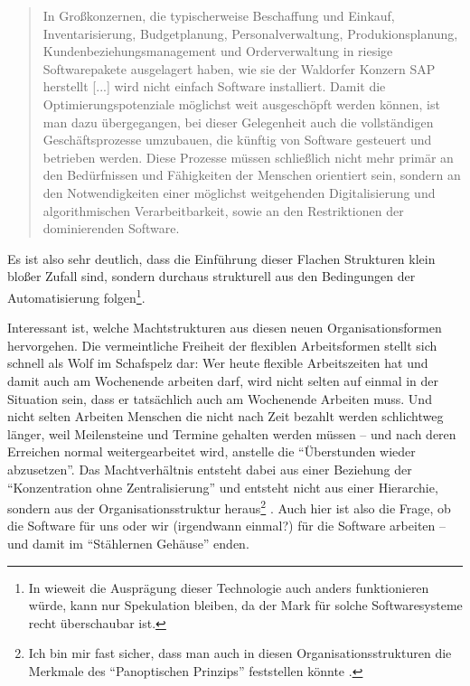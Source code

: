 \begin{quote}
	In Großkonzernen, die typischerweise Beschaffung und Einkauf, Inventarisierung, Budgetplanung, Personalverwaltung, Produkionsplanung, Kundenbeziehungsmanagement und Orderverwaltung in riesige Softwarepakete ausgelagert haben, wie sie der Waldorfer Konzern SAP herstellt [...] wird nicht einfach Software installiert. Damit die Optimierungspotenziale möglichst weit ausgeschöpft werden können, ist man dazu übergegangen, bei dieser Gelegenheit auch die vollständigen Geschäftsprozesse umzubauen, die künftig von Software gesteuert und betrieben werden. Diese Prozesse müssen schließlich nicht mehr primär an den Bedürfnissen und Fähigkeiten der Menschen orientiert sein, sondern an den Notwendigkeiten einer möglichst weitgehenden Digitalisierung und algorithmischen Verarbeitbarkeit, sowie an den Restriktionen der dominierenden Software.
	
	\em \cite[172f.]{arbeitsfrei}
\end{quote}

Es ist also sehr deutlich, dass die Einführung dieser Flachen Strukturen klein bloßer Zufall sind, sondern durchaus strukturell aus den Bedingungen der Automatisierung folgen\footnote{In wieweit die Ausprägung dieser Technologie auch anders funktionieren würde, kann nur Spekulation bleiben, da der Mark für solche Softwaresysteme recht überschaubar ist\parencite[173]{arbeitsfrei}.}.

Interessant ist, welche Machtstrukturen aus diesen neuen Organisationsformen hervorgehen.
Die vermeintliche Freiheit der flexiblen Arbeitsformen stellt sich schnell als Wolf im Schafspelz dar: Wer heute flexible Arbeitszeiten hat und damit auch am Wochenende arbeiten darf, wird nicht selten auf einmal in der Situation sein, dass er tatsächlich auch am Wochenende Arbeiten muss. Und nicht selten Arbeiten Menschen die nicht nach Zeit bezahlt werden schlichtweg länger, weil Meilensteine und Termine gehalten werden müssen – und nach deren Erreichen normal weitergearbeitet wird, anstelle die \enquote{Überstunden wieder abzusetzen}.
Das Machtverhältnis entsteht dabei aus einer Beziehung der \enquote{Konzentration ohne Zentralisierung} und entsteht nicht aus einer Hierarchie, sondern aus der Organisationsstruktur heraus\footnote{Ich bin mir fast sicher, dass man auch in diesen Organisationsstrukturen die Merkmale des \enquote{Panoptischen Prinzips} feststellen könnte \parencite{foucault}.} \parencite[70]{sennett}.
Auch hier ist also die Frage, ob die Software für uns oder wir (irgendwann einmal?) für die Software arbeiten – und damit im \enquote{Stählernen Gehäuse} enden.

